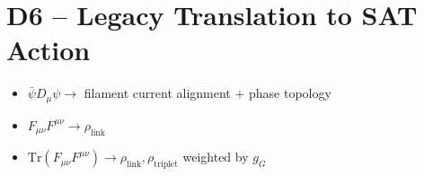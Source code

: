 \documentclass[12pt]{article}
\begin{document}
\section*{D6 – Legacy Translation to SAT Action}
\begin{itemize}
  \item \( \bar\psi D_\mu \psi \rightarrow \) filament current alignment + phase topology
  \item \( F_{\mu\nu} F^{\mu\nu} \rightarrow \rho_{\text{link}} \)
  \item \( \text{Tr}(F_{\mu\nu} F^{\mu\nu}) \rightarrow \rho_{\text{link}}, \rho_{\text{triplet}} \) weighted by \( g_G \)
\end{itemize}
\end{document}
